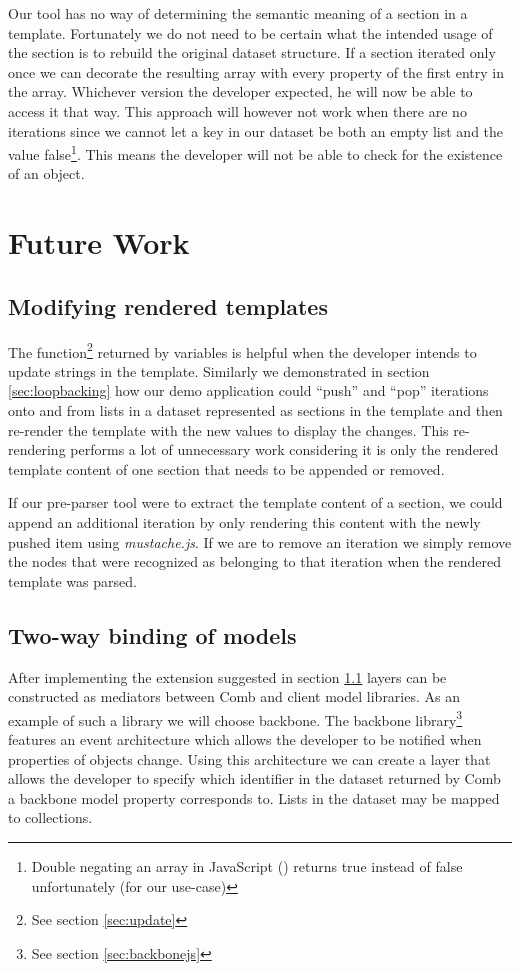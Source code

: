 \documentclass[thesis.tex]{subfiles}
\begin{document}
Our tool has no way of determining the semantic meaning of a section in a
template.
Fortunately we do not need to be certain what the intended usage of the section
is to rebuild the original dataset structure.
If a section iterated only once we can decorate the resulting array with every
property of the first entry in the array. Whichever version the developer
expected, he will now be able to access it that way. This approach will however
not work when there are no iterations since we cannot let a key in our dataset
be both an empty list and the value false\footnote{Double negating an array in
JavaScript (\inline{\!\![]}) returns true instead of false unfortunately
(for our use-case)}.
This means the developer will not be able to check for the existence of an
object.




\section{Future Work}

\subsection{Modifying rendered templates}
\label{sec:update-dom}
The  function\footnote{See section \ref{sec:update}} returned
by variables is helpful when the developer intends to update strings in the
template. Similarly we demonstrated in section \ref{sec:loopbacking} how our
demo application could ``push'' and ``pop'' iterations onto and from lists in
a dataset represented as sections in the template and then re-render the
template with the new values to display the changes.
This re-rendering performs a lot of unnecessary work considering it is only
the rendered template content of one section that needs to be appended or
removed.

If our pre-parser tool were to extract the template content of a section, we
could append an additional iteration by only rendering this content with the
newly pushed item using \emph{mustache.js}.
If we are to remove an iteration we simply remove the nodes that were recognized
as belonging to that iteration when the rendered template was parsed.

\subsection{Two-way binding of models}
\label{sec:two-way-binding}
After implementing the extension suggested in section \ref{sec:update-dom}
layers can be constructed as mediators between Comb and client model libraries.
As an example of such a library we will choose backbone.
The backbone library\footnote{See section \ref{sec:backbonejs}}
features an event architecture which allows the developer to be notified when
properties of objects change.
Using this architecture we can create a layer that allows the
developer to specify which identifier in the dataset returned by Comb a
backbone model property corresponds to. Lists in the dataset may be mapped to
collections.
\end{document}
